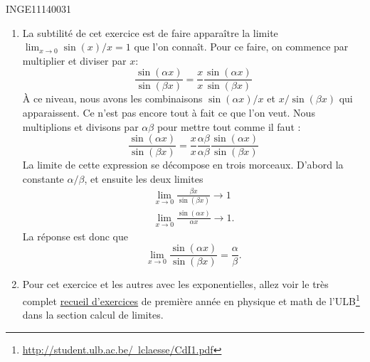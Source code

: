 \begin{corrige}{INGE11140031}
\begin{enumerate}
		\item
			La subtilité de cet exercice est de faire apparaître la limite $\lim_{x\to 0} \sin(x)/x=1$ que l'on connaît. Pour ce faire, on commence par multiplier et diviser par $x$:
			\begin{equation}
				\frac{ \sin(\alpha x) }{ \sin(\beta x) }=\frac{ x }{ x } \frac{ \sin(\alpha x) }{ \sin(\beta x) }
			\end{equation}
			À ce niveau, nous avons les combinaisons $\sin(\alpha x)/x$ et $x/\sin(\beta x)$ qui apparaissent. Ce n'est pas encore tout à fait ce que l'on veut. Nous multiplions et divisons par $\alpha\beta$ pour mettre tout comme il faut :
			\begin{equation}
				\frac{ \sin(\alpha x) }{ \sin(\beta x) }=\frac{ x }{ x } \frac{ \alpha\beta }{ \alpha\beta }\frac{ \sin(\alpha x) }{ \sin(\beta x) }
			\end{equation}
			La limite de cette expression se décompose en trois morceaux. D'abord la constante $\alpha/\beta$, et ensuite les deux limites
			\begin{subequations}
				\begin{align}
					\lim_{x\to 0} \frac{ \beta x }{ \sin(\beta x) }\to 1\\
					\lim_{x\to 0} \frac{\sin(\alpha x)}{ \alpha x }\to 1.
				\end{align}
			\end{subequations}
			La réponse est donc que
			\begin{equation}
				\lim_{x\to 0} \frac{ \sin(\alpha x) }{ \sin(\beta x) }=\frac{ \alpha }{ \beta }.
			\end{equation}

		\item
			Pour cet exercice et les autres avec les exponentielles, allez voir le très complet \href{http://student.ulb.ac.be/~lclaesse/CdI1.pdf}{recueil d'exercices} de première année en physique et math de l'ULB\footnote{\href{http://student.ulb.ac.be/~lclaesse/CdI1.pdf}{http://student.ulb.ac.be/~lclaesse/CdI1.pdf}} dans la section \og calcul de limites\fg. 
		

\end{enumerate}
\end{corrige}
